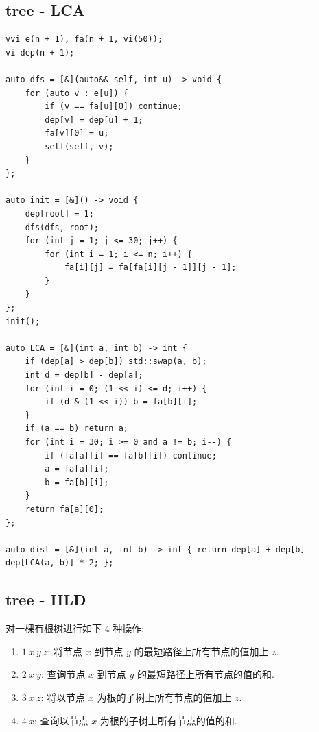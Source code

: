 \documentclass[UTF8, a4paper, titlepage, twoside]{ctexart}
\begin{document}
\subsection{ tree - LCA }
\begin{lstlisting}[style=cpp]
vvi e(n + 1), fa(n + 1, vi(50));
vi dep(n + 1);

auto dfs = [&](auto&& self, int u) -> void {
    for (auto v : e[u]) {
        if (v == fa[u][0]) continue;
        dep[v] = dep[u] + 1;
        fa[v][0] = u;
        self(self, v);
    }
};

auto init = [&]() -> void {
    dep[root] = 1;
    dfs(dfs, root);
    for (int j = 1; j <= 30; j++) {
        for (int i = 1; i <= n; i++) {
            fa[i][j] = fa[fa[i][j - 1]][j - 1];
        }
    }
};
init();

auto LCA = [&](int a, int b) -> int {
    if (dep[a] > dep[b]) std::swap(a, b);
    int d = dep[b] - dep[a];
    for (int i = 0; (1 << i) <= d; i++) {
        if (d & (1 << i)) b = fa[b][i];
    }
    if (a == b) return a;
    for (int i = 30; i >= 0 and a != b; i--) {
        if (fa[a][i] == fa[b][i]) continue;
        a = fa[a][i];
        b = fa[b][i];
    }
    return fa[a][0];
};

auto dist = [&](int a, int b) -> int { return dep[a] + dep[b] - dep[LCA(a, b)] * 2; };
\end{lstlisting}

\subsection{ tree - HLD }
对一棵有根树进行如下 \(4\) 种操作:
\begin{enumerate}
	\item \(1 \ x \ y \ z\): 将节点 \(x\) 到节点 \(y\) 的最短路径上所有节点的值加上 \(z\).
	\item \(2 \ x \ y\): 查询节点 \(x\) 到节点 \(y\) 的最短路径上所有节点的值的和.
	\item \(3 \ x \ z\): 将以节点 \(x\) 为根的子树上所有节点的值加上 \(z\).
	\item \(4 \ x\): 查询以节点 \(x\) 为根的子树上所有节点的值的和.
\end{enumerate}
\end{document}
